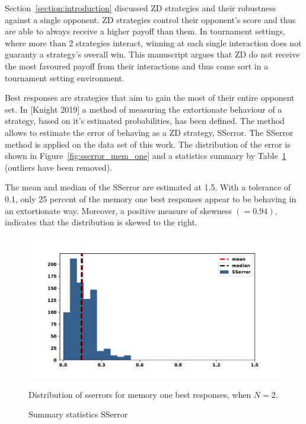 \documentclass[10pt]{article}
\begin{document}
Section~\ref{section:introduction} discussed ZD strategies and their robustness
against a single opponent. ZD strategies control their opponent's score and thus
are able to always receive a higher payoff than them. In tournament settings,
where more than 2 strategies interact, winning at each single interaction does
not guaranty a strategy's overall win. This manuscript argues that ZD do not
receive the most favoured payoff from their interactions and thus come sort in a
tournament setting environment.

Best responses are strategies that aim to gain the most of their entire opponent
set. In [Knight 2019] a method of measuring the extortionate behaviour of a
strategy, based on it's estimated probabilities, has been defined. The method
allows to estimate the error of behaving as a ZD strategy, SSerror. The SSerror
method is applied on the data set of this work. The distribution of the error is
shown in Figure~\ref{fig:sserror_mem_one} and a statistics summary by
Table~\ref{table:sserror_stats} (outliers have been removed).

The mean and median of the SSerror are estimated at 1.5. With a tolerance of 0.1,
only 25 percent of the memory one best responses appear to be behaving in an
extortionate way. Moreover, a positive measure of skewness \((=0.94)\), indicates
that the distribution is skewed to the right. 

\begin{figure}
    \begin{minipage}{0.59\textwidth}
            \begin{center}
            \includegraphics[width=\linewidth]{img/best_respones_sserror_remove_outliers.pdf}
            \end{center}
            \caption{Distribution of sserrors for memory one best responses, when \(N=2\).}
            \label{fig:sserror_mem_one}
    \end{minipage}
    \hfill
    \begin{minipage}{0.39\textwidth}
        \centering
        \captionsetup{type=table}
        \resizebox{.4\columnwidth}{!}{%
            }
            \caption{Summary statistics SSerror}
            \label{table:sserror_stats}
      \end{minipage}
\end{figure}
\end{document}

